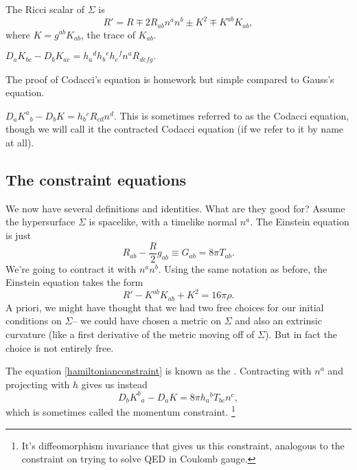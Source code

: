 \begin{lem}
    The Ricci scalar of $\Sigma$ is 
    \begin{equation}
        R'=R\mp 2 R_{ab} n^a n^b \pm K^2 \mp K^{ab}K_{ab},
    \end{equation}
    where $K=g^{ab}K_{ab}$, the trace of $K_{ab}$.
\end{lem}
\begin{prop}
    $D_aK_{bc}-D_b K_{ac}=h_a{}^d h_b{}^e h_c{}^f n^a R_{defg}.$
\end{prop}
The proof of Codacci's equation is homework but simple compared to Gauss's equation.
\begin{lem}
    $D_a K^a{}_b-D_b K = h_b{}^c R_{cd} n^d$.
    This is sometimes referred to as the Codacci equation, though we will call it the contracted Codacci equation (if we refer to it by name at all).
\end{lem}

\subsection*{The constraint equations} We now have several definitions and identities. What are they good for? Assume the hypersurface $\Sigma$ is spacelike, with a timelike normal $n^a$. The Einstein equation is just
\begin{equation*}
    R_{ab}-\frac{R}{2}g_{ab}\equiv G_{ab}=8\pi T_{ab}.
\end{equation*}
We're going to contract it with $n^a n^b$. Using the same notation as before, the Einstein equation takes the form
\begin{equation}\label{hamiltonianconstraint}
    R'-K^{ab}K_{ab} +K^2 = 16\pi \rho.
\end{equation}
A priori, we might have thought that we had two free choices for our initial conditions on $\Sigma$-- we could have chosen a metric on $\Sigma$ and also an extrinsic curvature (like a first derivative of the metric moving off of $\Sigma$). But in fact the choice is not entirely free.

The equation \ref{hamiltonianconstraint} is known as the . Contracting with $n^a$ and projecting with $h$ gives us instead
\begin{equation}
    D_b K^b{}_a - D_a K = 8\pi h_a{}^b T_{bc} n^c,
\end{equation}
which is sometimes called the momentum constraint.%
    \footnote{It's diffeomorphism invariance that gives us this constraint, analogous to the constraint on trying to solve QED in Coulomb gauge.}
    
